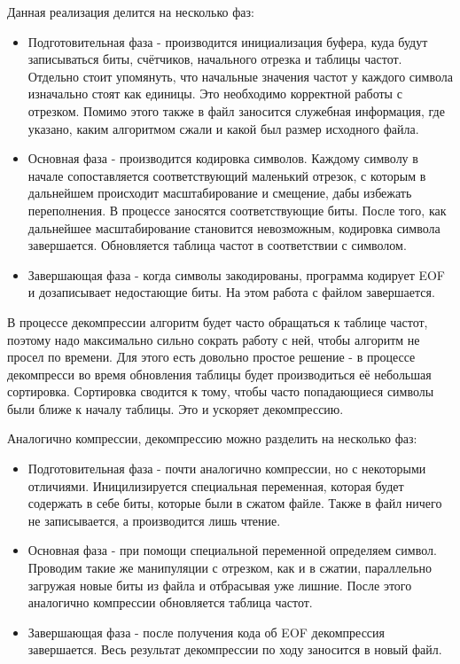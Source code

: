\documentclass[12pt]{article}
\begin{document}
Данная реализация делится на несколько фаз:
\begin{itemize}
	\item Подготовительная фаза - производится инициализация буфера, куда будут записываться биты, счётчиков, начального отрезка и таблицы частот. Отдельно стоит упомянуть, что начальные значения частот у каждого символа изначально стоят как единицы. Это необходимо корректной работы с отрезком. Помимо этого также в файл заносится служебная информация, где указано, каким алгоритмом сжали и какой был размер исходного файла.
	\item Основная фаза - производится кодировка символов. Каждому символу в начале сопоставляется соответствующий маленький отрезок, с которым в дальнейшем происходит масштабирование и смещение, дабы избежать переполнения. В процессе заносятся соответствующие биты. После того, как дальнейшее масштабирование становится невозможным, кодировка символа завершается. Обновляется таблица частот в соответствии с символом.
	\item Завершающая фаза - когда символы закодированы, программа кодирует EOF и дозаписывает недостающие биты. На этом работа с файлом завершается.
\end{itemize}

В процессе декомпрессии алгоритм будет часто обращаться к таблице частот, поэтому надо максимально сильно сократь работу с ней, чтобы алгоритм не просел по времени. Для этого есть довольно простое решение - в процессе декомпресси во время обновления таблицы будет производиться её небольшая сортировка. Сортировка сводится к тому, чтобы часто попадающиеся символы были ближе к началу таблицы. Это и ускоряет декомпрессию.

Аналогично компрессии, декомпрессию можно разделить на несколько фаз:
\begin{itemize}
	\item Подготовительная фаза - почти аналогично компрессии, но с некоторыми отличиями. Иницилизируется специальная переменная, которая будет содержать в себе биты, которые были в сжатом файле. Также в файл ничего не записывается, а производится лишь чтение.
	\item Основная фаза - при помощи специальной переменной определяем символ. Проводим такие же манипуляции с отрезком, как и в сжатии, параллельно загружая новые биты из файла и отбрасывая уже лишние. После этого аналогично компрессии обновляется таблица частот.
	\item Завершающая фаза - после получения кода об EOF декомпрессия завершается. Весь результат декомпрессии по ходу заносится в новый файл.
\end{itemize}
\end{document}
